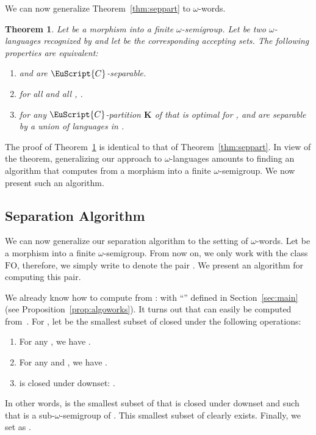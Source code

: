 \documentclass{CSML}
\newcommand\Cs{\ensuremath{\EuScript{C}}\xspace}
\newcommand\Kb{\ensuremath{\mathbf{K}}\xspace}
\newcommand{\fo}{\ensuremath{\text{FO}}\xspace}
\newcommand\iwords{\ensuremath{\omega}-words\xspace}
\newcommand\ilangs{\ensuremath{\omega}-languages\xspace}
\newcommand\sisemi{sub-\ensuremath{\omega}-semigroup\xspace}
\newcommand\isemi{\ensuremath{\omega}-semigroup\xspace}
\theoremstyle{plain}
\newtheorem{theorem}[thm]{Theorem}
\begin{document}
We can now generalize Theorem~\ref{thm:seppart} to \iwords.

\begin{theorem} \label{thm:sepparti}
Let  be a morphism into a
finite \isemi . Let  be two
\ilangs recognized by  and let 
be the corresponding accepting sets. The following properties are
equivalent:
\begin{enumerate}
\item\label{item:cov2sep1-inf}  and  are \Cs-separable.
\item\label{item:cov2sep2-inf} for all  and all , .
\item\label{item:cov2sep3-inf} for any \Cs-partition \Kb of 
  that is optimal for ,  and  are separable by a
  union of languages in .
\end{enumerate}\smallskip
\end{theorem}

\noindent The proof of Theorem~\ref{thm:sepparti} is identical to that of
Theorem~\ref{thm:seppart}. In view of the theorem, generalizing our
approach to \ilangs amounts to finding an algorithm that computes
 from a morphism  into a finite
\isemi. We now present such an algorithm.

\subsection{Separation Algorithm}

We can now generalize our separation algorithm to the setting of
\iwords. Let  be a morphism
into a finite \isemi . From now on, we only work with
the class \fo, therefore, we simply write
 to denote the pair
. We present an algorithm for
computing this pair.

We already know how to compute  from
:  with ``''
defined in Section~\ref{sec:main} (see
Proposition~\ref{prop:algoworks}). It turns out that
 can easily be computed from~.
For , let  be the smallest subset of  closed
under the following operations:
\begin{enumerate}
\item\label{eq:ioper1} For any , we have .
\item\label{eq:ioper2} For any  and , we have .
\item\label{eq:ioper3}  is closed under downset:
.
\end{enumerate}

In other words,  is the smallest subset of 
that is closed under downset and such that  is a
\sisemi of . This smallest subset of 
clearly exists. Finally, we set  as
.
\end{document}
